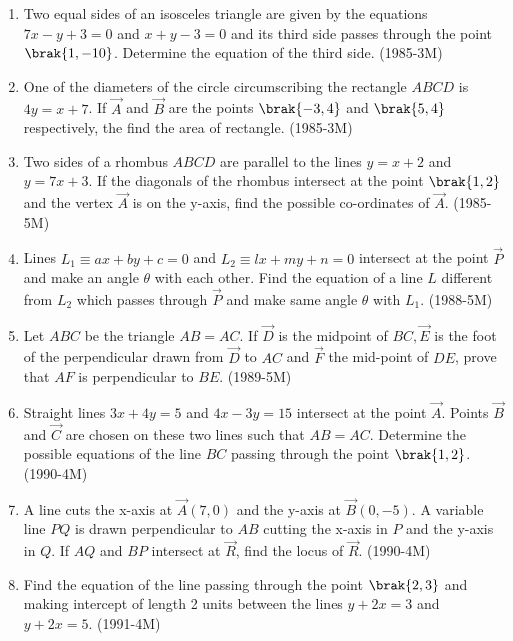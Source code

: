 \begin{enumerate}
\item Two equal sides of an isosceles triangle are given by the equations $7x-y+3=0$ and $x+y-3=0$ and its third side passes through the point $\brak{1,-10}$. Determine the equation of the third side.  \hfill{(1985-3M)}

\item One of the diameters of the circle circumscribing the rectangle $ABCD$ is $4y=x+ 7$. If $\vec{A}$ and $\vec{B}$ are the points $\brak{-3,4}$ and $\brak{5,4}$ respectively, the find the area of rectangle.  \hfill{(1985-3M)}


\item Two sides of a rhombus $ABCD$ are parallel to the lines $y=x+2$ and $y=7x+3$. If the diagonals of the rhombus intersect at the point $\brak{1,2}$ and the vertex $\vec{A}$ is on the y-axis, find the possible co-ordinates of $\vec{A}$.     \hfill{(1985-5M)} 

\item Lines $ L_1 \equiv ax+by+c =0 $ and $ L_2 \equiv lx+my+n =0 $ intersect at the point $\vec{P}$ and make an angle $\theta$ with each other. Find the equation of a line $L$ different from $L_2$ which passes through $\vec{P}$ and make same angle $\theta$ with $L_1$. \hfill{(1988-5M)}


\item Let $ABC$ be the triangle $AB=AC$. If $\vec{D}$ is the midpoint of $ BC, \vec{E}$ is the foot of the perpendicular drawn from $\vec{D}$ to $AC$ and $\vec{F}$ the mid-point of $DE$, prove that $AF$ is perpendicular to $BE.$ \hfill{(1989-5M)}

\item Straight lines $3x + 4y =5$ and $ 4x-3y= 15$ intersect at the point $\vec{A}$. Points $\vec{B}$ and $\vec{C}$ are chosen on these two lines such that $AB=AC$. Determine the possible equations of the line $BC$ passing through the point $\brak{1,2}$.\hfill{(1990-4M)}

\item A line cuts the x-axis at $\vec{A}(7,0)$ and the y-axis at $\vec{B}(0,-5)$. A variable line $PQ$ is drawn perpendicular to $AB$ cutting the x-axis in $P$ and the y-axis in $Q$. If $AQ$ and $BP$ intersect at $\vec{R}$, find the locus of $\vec{R}$.  \hfill{(1990-4M)}

\item Find the equation of the line passing through the point $\brak{2,3}$ and making intercept of length 2 units between the lines $ y + 2x = 3 $ and $ y + 2x = 5  $.     \hfill{(1991-4M)}
  \begin{center}
\begin{tikzpicture}
   

\end{tikzpicture}
\end{center}
\end{enumerate}
